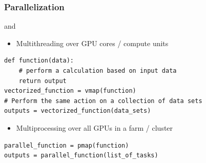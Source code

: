 \begin{frame}[fragile]
    \frametitle{Parallelization}

    \begin{figure}
       \begin{center}
       \end{center}
    \end{figure}
    
\end{frame}



\begin{frame}[fragile]

     and 

    \vspace{0.5em}
    \begin{itemize}
        \item Multithreading over GPU cores / compute units 
    \end{itemize}
    
    \begin{verbatim}
def function(data):
    # perform a calculation based on input data
    return output
vectorized_function = vmap(function)  
# Perform the same action on a collection of data sets
outputs = vectorized_function(data_sets)   
    \end{verbatim}

    \vspace{0.5em}
    \vspace{0.5em}
    \begin{itemize}
        \item Multiprocessing over all GPUs in a farm / cluster 
    \end{itemize}

    \begin{verbatim}
parallel_function = pmap(function)  
outputs = parallel_function(list_of_tasks)  
    \end{verbatim}

\end{frame}

